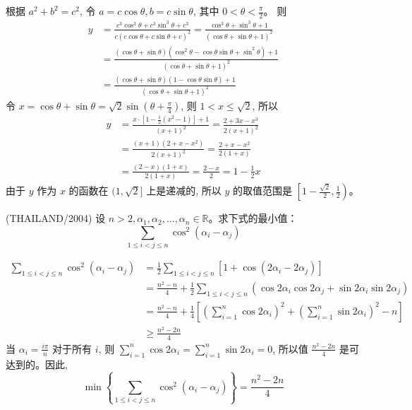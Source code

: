 \begin{questions}
\begin{solution}
根据 $a^2 + b^2 = c^2$, 令 $a = c \cos \theta, b = c \sin \theta$, 其中 $0 < \theta < \frac{\pi}{2}$。
则
\begin{align*}
y &= \frac{c^3 \cos^3 \theta + c^3 \sin^3 \theta + c^3}{c(c \cos \theta + c \sin \theta + c)^2} = \frac{\cos^3 \theta + \sin^3 \theta + 1}{(\cos \theta + \sin \theta + 1)^2} \\
&= \frac{(\cos \theta + \sin \theta)(\cos^2 \theta - \cos \theta \sin \theta + \sin^2 \theta) + 1}{(\cos \theta + \sin \theta + 1)^2} \\
&= \frac{(\cos \theta + \sin \theta)(1 - \cos \theta \sin \theta) + 1}{(\cos \theta + \sin \theta + 1)^2}
\end{align*}
令 $x = \cos \theta + \sin \theta = \sqrt{2} \sin \left( \theta + \frac{\pi}{4} \right)$, 则 $1 < x \le \sqrt{2}$, 所以
\begin{align*}
y &= \frac{x \cdot \left[ 1 - \frac{1}{2} (x^2 - 1) \right] + 1}{(x + 1)^2} = \frac{2 + 3x - x^3}{2(x + 1)^2} \\
&= \frac{(x + 1)(2 + x - x^2)}{2(x + 1)^2} = \frac{2 + x - x^2}{2(1 + x)} \\
&= \frac{(2 - x)(1 + x)}{2(1 + x)} = \frac{2 - x}{2} = 1 - \frac{1}{2}x
\end{align*}
由于 $y$ 作为 $x$ 的函数在 $(1, \sqrt{2}]$ 上是递减的, 所以 $y$ 的取值范围是 $\left[ 1 - \frac{\sqrt{2}}{2}, \frac{1}{2} \right)$。
\end{solution}

\question (THAILAND/2004) 设 $n > 2, \alpha_1, \alpha_2, \dots, \alpha_n \in \mathbb{R}$。求下式的最小值：
\[
\sum_{1 \le i < j \le n} \cos^2 (\alpha_i - \alpha_j)
\]

\begin{solution}
\begin{align*}
\sum_{1 \le i < j \le n} \cos^2 (\alpha_i - \alpha_j) &= \frac{1}{2} \sum_{1 \le i < j \le n} \left[ 1 + \cos(2\alpha_i - 2\alpha_j) \right] \\
&= \frac{n^2 - n}{4} + \frac{1}{2} \sum_{1 \le i < j \le n} (\cos 2\alpha_i \cos 2\alpha_j + \sin 2\alpha_i \sin 2\alpha_j) \\
&= \frac{n^2 - n}{4} + \frac{1}{4} \left[ \left( \sum_{i=1}^n \cos 2\alpha_i \right)^2 + \left( \sum_{i=1}^n \sin 2\alpha_i \right)^2 - n \right] \\
&\ge \frac{n^2 - 2n}{4}
\end{align*}
当 $\alpha_i = \frac{i\pi}{n}$ 对于所有 $i$, 则 $\sum_{i=1}^n \cos 2\alpha_i = \sum_{i=1}^n \sin 2\alpha_i = 0$, 所以值 $\frac{n^2 - 2n}{4}$ 是可达到的。因此,
\[
\min \left\{ \sum_{1 \le i < j \le n} \cos^2 (\alpha_i - \alpha_j) \right\} = \frac{n^2 - 2n}{4}
\]
\end{solution}


\end{questions}
